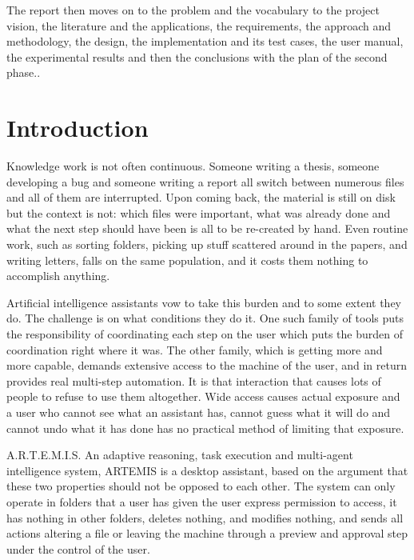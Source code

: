 \documentclass{FastFyp}
\begin{document}
The report then moves on to the problem and the vocabulary to the project vision, the literature and the applications, the requirements, the approach and methodology, the design, the implementation and its test cases, the user manual, the experimental results and then the conclusions with the plan of the second phase..
\pagebreak

\pagestyle{fancy}
\tableofcontents

\clearpage
{}
{}
\listoffigures
\clearpage
{}
{}
\listoftables

\mainmatter


\chapter{Introduction}
Knowledge work is not often continuous. Someone writing a thesis, someone developing a bug and someone writing a report all switch between numerous files and all of them are interrupted. Upon coming back, the material is still on disk but the context is not: which files were important, what was already done and what the next step should have been is all to be re-created by hand. Even routine work, such as sorting folders, picking up stuff scattered around in the papers, and writing letters, falls on the same population, and it costs them nothing to accomplish anything.

Artificial intelligence assistants vow to take this burden and to some extent they do. The challenge is on what conditions they do it. One such family of tools puts the responsibility of coordinating each step on the user which puts the burden of coordination right where it was. The other family, which is getting more and more capable, demands extensive access to the machine of the user, and in return provides real multi-step automation. It is that interaction that causes lots of people to refuse to use them altogether. Wide access causes actual exposure and a user who cannot see what an assistant has, cannot guess what it will do and cannot undo what it has done has no practical method of limiting that exposure.

A.R.T.E.M.I.S. An adaptive reasoning, task execution and multi-agent intelligence system, ARTEMIS is a desktop assistant, based on the argument that these two properties should not be opposed to each other. The system can only operate in folders that a user has given the user express permission to access, it has nothing in other folders, deletes nothing, and modifies nothing, and sends all actions altering a file or leaving the machine through a preview and approval step under the control of the user.
\end{document}
